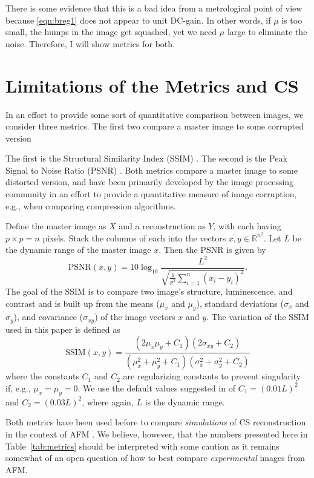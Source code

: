 \documentclass[11pt]{article}
\begin{document}
There is some evidence that this is a bad idea from a metrological point of view because \eqref{eqn:breg1} does not appear to unit DC-gain. In other words, if $\mu$ is too small, the humps in the image get squashed, yet we need $\mu$ large to eliminate the noise. Therefore, I will show metrics for both.

\section{Limitations of the Metrics and CS}
In an effort to provide some sort of quantitative comparison between images, we consider three metrics. The first two compare a master image to some corrupted version

The first is the Structural Similarity Index (SSIM) \cite{wang_image_2004}. The second is the Peak Signal to Noise Ratio (PSNR) \cite{Luo_nano_2015}. Both metrics compare a master image to some distorted version, and have been primarily developed by the image processing community in an effort to provide a quantitative measure of image corruption, e.g., when comparing compression algorithms.

Define the master image as $X$ and a reconstruction as $Y$, with each having $p\times p=n$ pixels. Stack the columns of each into the vectors $x, y\in\mathbb{R}^{n^2}$. Let $L$ be the dynamic range of the master image $x$. Then the PSNR is given by
\begin{equation*}
  \text{PSNR}(x,y) = 10\log_{10}\frac{L^2}
  {\sqrt{\frac{1}{p^2} \sum_{i=1}^{n}( x_{i} - y_{i})^2}}.
\end{equation*}
The goal of the SSIM is to compare two image's structure, luminescence, and contrast and is built up from the means ($\mu_x$ and $\mu_y$), standard deviations ($\sigma_x$ and $\sigma_y$), and covariance ($\sigma_{xy}$) of the image vectors $x$ and $y$.  
The variation of the SSIM used in this paper is defined as
\begin{equation*}
  \text{SSIM}(x,y) = \frac{(2\mu_x\mu_y + C_1)(2\sigma_{xy}+C_2)}
  {(\mu_x^2 + \mu_y^2 + C_1)(\sigma_x^2 + \sigma_y^2 + C_2)}
\end{equation*}
where the constants $C_1$ and $C_2$ are regularizing constants to prevent singularity if, e.g., $\mu_x=\mu_y=0$. We use the default values suggested in \cite{wang_image_2004} of $C_1=(0.01L)^2$ and ${C_2=(0.03L)^2}$, where again, $L$ is the dynamic range.

Both metrics have been used before to compare \emph{simulations} of CS reconstruction in the context of AFM \cite{oxvig_structure_2017, Luo_nano_2015}. We believe, however, that the numbers presented here in Table~\ref{tab:metrics} should be interpreted with some caution as it remains somewhat of an open question of how to best compare \emph{experimental} images from AFM.
\end{document}
